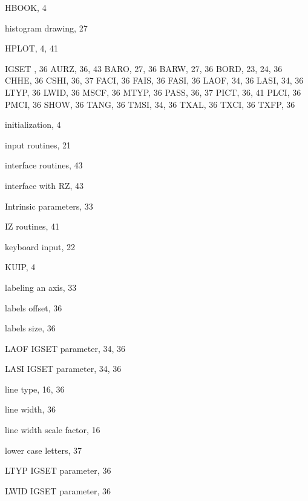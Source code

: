 \begin{theindex}
  \indexspace
 
  \item HBOOK, 4
  \item histogram drawing, 27
  \item HPLOT, 4, 41
 
  \indexspace
 
  \item IGSET
    \subitem *, 36
    \subitem AURZ, 36, 43
    \subitem BARO, 27, 36
    \subitem BARW, 27, 36
    \subitem BORD, 23, 24, 36
    \subitem CHHE, 36
    \subitem CSHI, 36, 37
    \subitem FACI, 36
    \subitem FAIS, 36
    \subitem FASI, 36
    \subitem LAOF, 34, 36
    \subitem LASI, 34, 36
    \subitem LTYP, 36
    \subitem LWID, 36
    \subitem MSCF, 36
    \subitem MTYP, 36
    \subitem PASS, 36, 37
    \subitem PICT, 36, 41
    \subitem PLCI, 36
    \subitem PMCI, 36
    \subitem SHOW, 36
    \subitem TANG, 36
    \subitem TMSI, 34, 36
    \subitem TXAL, 36
    \subitem TXCI, 36
    \subitem TXFP, 36
  \item initialization, 4
  \item input routines, 21
  \item interface routines, 43
  \item interface with RZ, 43
  \item Intrinsic parameters, 33
  \item IZ routines, 41
 
  \indexspace
 
  \item keyboard input, 22
  \item KUIP, 4
 
  \indexspace
 
  \item labeling an axis, 33
  \item labels offset, 36
  \item labels size, 36
  \item LAOF
    \subitem IGSET parameter, 34, 36
  \item LASI
    \subitem IGSET parameter, 34, 36
  \item line type, 16, 36
  \item line width, 36
  \item line width scale factor, 16
  \item lower case letters, 37
  \item LTYP
    \subitem IGSET parameter, 36
  \item LWID
    \subitem IGSET parameter, 36
 

\end{theindex}
